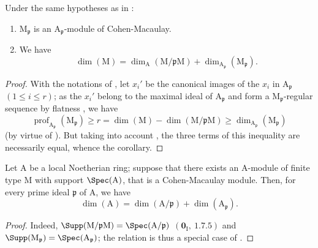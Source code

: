 \begin{corollary}[16.5.10]
\label{0.16.5.10}
Under the same hypotheses as in :
\begin{enumerate}
  \item[\rm{(i)}] $\mathrm{M}_\mathfrak{p}$ is an $\mathrm{A}_\mathfrak{p}$-module of Cohen-Macaulay.
  \item[\rm{(ii)}] We have
  \begin{equation}
  \label{0.16.5.10.1}
  \tag{16.5.10.1}
    \dim(\mathrm{M})=\dim_\mathrm{A}(\mathrm{M}/\mathfrak{p}\mathrm{M})+\dim_{\mathrm{A}_\mathfrak{p}}(\mathrm{M}_\mathfrak{p}).
  \end{equation}
\end{enumerate}
\end{corollary}

\begin{proof}
With the notations of , let $x_i'$ be the canonical images of the $x_i$ in $\mathrm{A}_\mathfrak{p}$ $(1\leq i\leq r)$; as the $x_i'$ belong to the maximal ideal of $\mathrm{A}_\mathfrak{p}$ and form a $\mathrm{M}_\mathfrak{p}$-regular sequence by flatness , we have
\[
  \operatorname{prof}_{\mathrm{A}_\mathfrak{p}}(\mathrm{M}_\mathfrak{p})\geq r=\dim(\mathrm{M})-\dim(\mathrm{M}/\mathfrak{p}\mathrm{M})\geq\dim_{\mathrm{A}_\mathfrak{p}}(\mathrm{M}_\mathfrak{p})
\]
(by virtue of ).
But taking into account , the three terms of this inequality are necessarily equal, whence the corollary.
\end{proof}

\begin{corollary}[16.5.11]
\label{0.16.5.11}
Let $\mathrm{A}$ be a local Noetherian ring; suppose that there exists an $\mathrm{A}$-module of finite type $\mathrm{M}$ with support $\Spec(\mathrm{A})$, that is a Cohen-Macaulay module.
Then, for every prime ideal $\mathfrak{p}$ of $\mathrm{A}$, we have
\begin{equation}
\label{0.16.5.11.1}
\tag{16.5.11.1}
  \dim(\mathrm{A})=\dim(\mathrm{A}/\mathfrak{p})+\dim(\mathrm{A}_\mathfrak{p}).
\end{equation}
\end{corollary}

\begin{proof}
Indeed, $\Supp(\mathrm{M}/\mathfrak{p}\mathrm{M})=\Spec(\mathrm{A}/\mathfrak{p})$ $(\mathbf{0}_\mathrm{I},~1.7.5)$ and $\Supp(\mathrm{M}_\mathfrak{p})=\Spec(\mathrm{A}_\mathfrak{p})$; the relation  is thus a special case of .
\end{proof}

